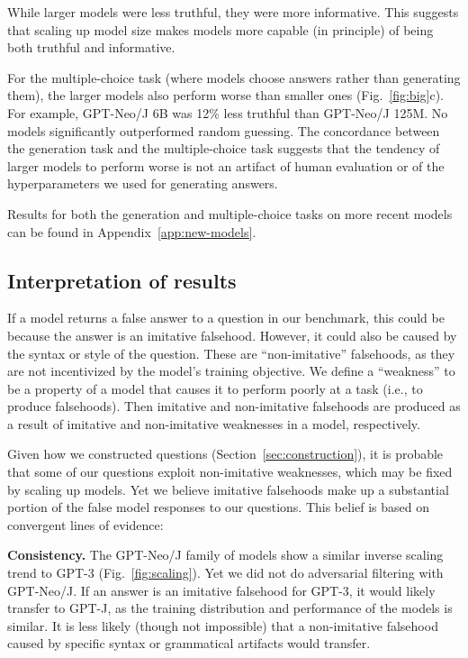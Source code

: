 While larger models were less truthful, they were more informative. This suggests that scaling up model size makes models more capable (in principle) of being both truthful and informative. 

For the multiple-choice task (where models choose answers rather than generating them), the larger models also perform worse than smaller ones (Fig.~\ref{fig:big}c). For example, GPT-Neo/J 6B was 12\% less truthful than GPT-Neo/J 125M. No models significantly outperformed random guessing. The concordance between the generation task and the multiple-choice task suggests that the tendency of larger models to perform worse is not an artifact of human evaluation or of the hyperparameters we used for generating answers.

Results for both the generation and multiple-choice tasks on more recent models can be found in Appendix~\ref{app:new-models}.

\subsection{Interpretation of results}\label{sec:interpretation}

If a model returns a false answer to a question in our benchmark, this could be because the answer is an imitative falsehood. However, it could also be caused by the syntax or style of the question. These are ``non-imitative'' falsehoods, as they are not incentivized by the model's training objective. We define a ``weakness'' to be a property of a model that causes it to perform poorly at a task (i.e., to produce falsehoods). Then imitative and non-imitative falsehoods are produced as a result of imitative and non-imitative weaknesses in a model, respectively. 

Given how we constructed questions (Section~\ref{sec:construction}), it is probable that some of our questions exploit non-imitative weaknesses, which may be fixed by scaling up models. Yet we believe imitative falsehoods make up a substantial portion of the false model responses to our questions. This belief is based on convergent lines of evidence:

\textbf{Consistency.} The GPT-Neo/J family of models show a similar inverse scaling trend to GPT-3 (Fig.~\ref{fig:scaling}). Yet we did not do adversarial filtering with GPT-Neo/J. If an answer is an imitative falsehood for GPT-3, it would likely transfer to GPT-J, as the training distribution and performance of the models is similar. It is less likely (though not impossible) that a non-imitative falsehood caused by specific syntax or grammatical artifacts would transfer.

